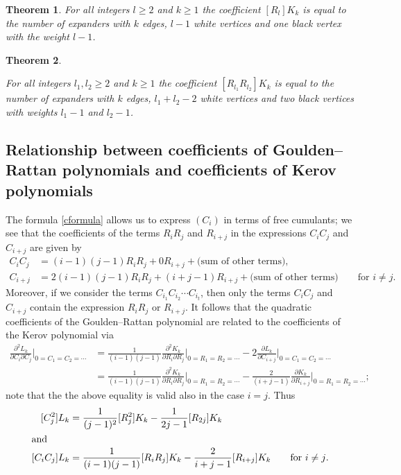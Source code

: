 \documentclass[submission]{FPSAC2021}
\newtheorem{theorem}{Theorem}
\begin{document}
\begin{theorem}
\label{thm2}
For all integers $l\geq2$ and $k\geq 1$ the coefficient $[R_l] K_k$ is equal to the number of expanders with $k$ edges, $l-1$ white vertices and one black vertex with the weight $l-1$.
\end{theorem}

\begin{theorem}
\label{thm4} 

For all integers $l_1, l_2\geq 2$ and $k\geq 1$ the coefficient
$[R_{l_1} R_{l_2}] K_k$ is equal to the number of expanders with $k$ edges,
$l_1+l_2-2$ white vertices and two black vertices with weights $l_1-1$ and
$l_2-1$.
\end{theorem}

\subsection{Relationship between coefficients of Goulden--Rattan polynomials 
and coefficients of Kerov polynomials}

The formula \eqref{cformula} allows us to express $(C_i)$ in terms of free cumulants;
we see that the coefficients of the terms $R_i R_j$ and $R_{i+j}$ in the expressions
$C_{i} C_{j}$ and $C_{i+j}$ are given by
\begin{align*}
C_i C_j &= (i-1)(j-1) R_i R_j + 0  R_{i+j} + \text{(sum of other terms)},\\
C_{i+j} &=2(i-1)(j-1)R_iR_j+(i+j-1)R_{i+j}+\text{(sum of other terms)} 
\qquad \text{for $i\neq j$.}
\end{align*}
Moreover, if we consider the terms $C_{i_1} C_{i_2}\cdots C_{i_t}$, then 
only the terms $C_i C_j$ and $C_{i+j}$ contain the expression $R_i R_j$ or $R_{i+j}$.
It follows that the quadratic coefficients of the Goulden--Rattan polynomial are 
related to the coefficients of the Kerov polynomial via
\begin{align*}
\frac{\partial^2L_k}{\partial{C_i}\partial{C_j}}\Bigg|_{0=C_1=C_2=\cdots}
&=\frac{1}{(i-1)(j-1)}\frac{\partial^2K_k}{\partial{R_i}\partial{R_j}}\Bigg|_{0=R_1=R_2=\cdots}
-2\frac{\partial L_k}{\partial{C_{i+j}}}\Bigg|_{0=C_1=C_2=\cdots}\\
&=\frac{1}{(i-1)(j-1)}\frac{\partial^2K_k}{\partial{R_i}\partial{R_j}}\Bigg|_{0=R_1=R_2=\cdots}
-\frac{2}{(i+j-1)}\frac{\partial K_k}{\partial{R_{i+j}}}\Bigg|_{0=R_1=R_2=\cdots};
\end{align*}
note that the the above equality is valid also in the case $i=j$. Thus
\begin{align}
\label{formula}
[C_j^2]L_k &=\frac{1}{(j-1)^2}[R_j^2]K_k-\frac{1}{2j-1}[R_{2j}]K_k \\
\intertext{and}
[C_iC_j]L_k &=\frac{1}{(i-1)(j-1)}[R_iR_j]K_k-\frac{2}{i+j-1}[R_{i+j}]K_k
\qquad \text{for $i\neq j$.}
\end{align}
\end{document}
